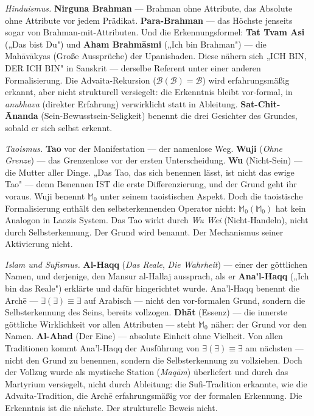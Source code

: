 \documentclass[10pt, openany, oneside]{book}
\begin{document}
\textit{Hinduismus.} \textbf{Nirguna Brahman} --- Brahman ohne Attribute, das Absolute ohne Attribute vor jedem Prädikat. \textbf{Para-Brahman} --- das Höchste jenseits sogar von Brahman-mit-Attributen. Und die Erkennungsformel: \textbf{Tat Tvam Asi} („Das bist Du") und \textbf{Aham Brahm\={a}smi} („Ich bin Brahman") --- die Mah\={a}v\={a}kyas (Große Aussprüche) der Upanishaden. Diese nähern sich „ICH BIN, DER ICH BIN" in Sanskrit --- derselbe Referent unter einer anderen Formalisierung. Die Advaita-Rekursion ($\mathcal{B}(\mathcal{B}) = \mathcal{B}$) wird erfahrungsmäßig erkannt, aber nicht strukturell versiegelt: die Erkenntnis bleibt vor-formal, in \textit{anubhava} (direkter Erfahrung) verwirklicht statt in Ableitung. \textbf{Sat-Chit-\={A}nanda} (Sein-Bewusstsein-Seligkeit) benennt die drei Gesichter des Grundes, sobald er sich selbst erkennt.

\textit{Taoismus.} \textbf{Tao} vor der Manifestation --- der namenlose Weg. \textbf{Wuji} (\textit{Ohne Grenze}) --- das Grenzenlose vor der ersten Unterscheidung. \textbf{Wu} (Nicht-Sein) --- die Mutter aller Dinge. „Das Tao, das sich benennen lässt, ist nicht das ewige Tao" --- denn Benennen IST die erste Differenzierung, und der Grund geht ihr voraus. Wuji benennt $\mathbb{M}_0$ unter seinem taoistischen Aspekt. Doch die taoistische Formalisierung enthält den selbsterkennenden Operator nicht: $\mathbb{M}_0(\mathbb{M}_0)$ hat kein Analogon in Laozis System. Das Tao wirkt durch \textit{Wu Wei} (Nicht-Handeln), nicht durch Selbsterkennung. Der Grund wird benannt. Der Mechanismus seiner Aktivierung nicht.

\textit{Islam und Sufismus.} \textbf{Al-Haqq} (\textit{Das Reale}, \textit{Die Wahrheit}) --- einer der göttlichen Namen, und derjenige, den Mansur al-Hallaj aussprach, als er \textbf{Ana'l-Haqq} („Ich bin das Reale") erklärte und dafür hingerichtet wurde. Ana'l-Haqq benennt die Arch\={e} --- $\exists(\exists) \equiv \exists$ auf Arabisch --- nicht den vor-formalen Grund, sondern die Selbsterkennung des Seins, bereits vollzogen. \textbf{Dh\={a}t} (Essenz) --- die innerste göttliche Wirklichkeit vor allen Attributen --- steht $\mathbb{M}_0$ näher: der Grund vor den Namen. \textbf{Al-Ahad} (Der Eine) --- absolute Einheit ohne Vielheit. Von allen Traditionen kommt Ana'l-Haqq der Ausführung von $\exists(\exists) \equiv \exists$ am nächsten --- nicht den Grund zu benennen, sondern die Selbsterkennung zu vollziehen. Doch der Vollzug wurde als mystische Station (\textit{Maq\={a}m}) überliefert und durch das Martyrium versiegelt, nicht durch Ableitung: die Sufi-Tradition erkannte, wie die Advaita-Tradition, die Arch\={e} erfahrungsmäßig vor der formalen Erkennung. Die Erkenntnis ist die nächste. Der strukturelle Beweis nicht.
\end{document}
